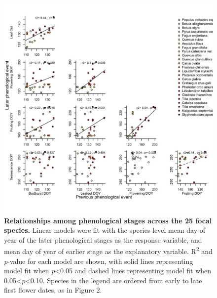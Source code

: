 \documentclass{article}
\begin{document}
  \begin{figure}[h]
  \centering
  \includegraphics{../analyses/figures/latevearly_rp_col_legend_YOR.pdf}
  
  \caption{\textbf{Relationships among phenological stages across the 25 focal species.} Linear models were fit with the species-level mean day of year of the later phenological stages as the response variable, and mean day of year of earlier stage as the explanatory variable. R\textsuperscript{2} and \textit{p}-value for each model are shown, with solid lines representing model fit when \textit{p}<0.05 and dashed lines representing model fit when 0.05<\textit{p}<0.10. Species in the legend are ordered from early to late first flower dates, as in Figure 2.}
  \label{fig:latevearly}
\end{figure}
\end{document}
